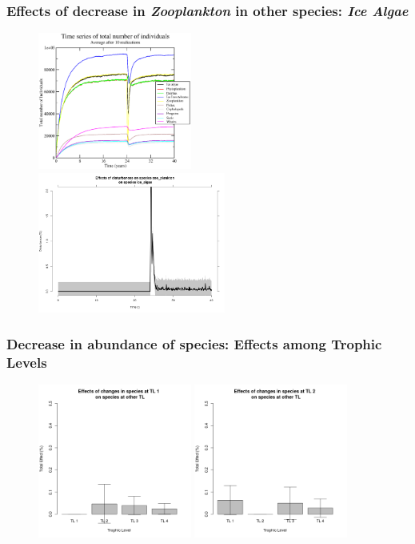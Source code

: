 \documentclass[xcolor=x11names,compress]{beamer}
\renewcommand{\(}{\begin{columns}}
\renewcommand{\)}{\end{columns}}
\newcommand{\<}[1]{\begin{column}{#1}}
\renewcommand{\>}{\end{column}}
\begin{document}
\begin{frame}
\frametitle{Effects of decrease in \emph{Zooplankton} in other species: \emph{Ice Algae}}
\begin{figure}
 \includegraphics[width=0.45\textwidth]{./figures/ant_dec05.eps} 
 \includegraphics[width=0.55\textwidth]{./figures/ant_stdevperkins_dec05_species_sp1}
\end{figure}
\end{frame}

\begin{frame}
\frametitle{Decrease in abundance of species: Effects among Trophic Levels}
\begin{figure}
 \includegraphics[width=0.45\textwidth]{./figures/Effects_of_TL1} 
 \includegraphics[width=0.45\textwidth]{./figures/Effects_of_TL2} 
\end{figure}
\end{frame}
\end{document}
